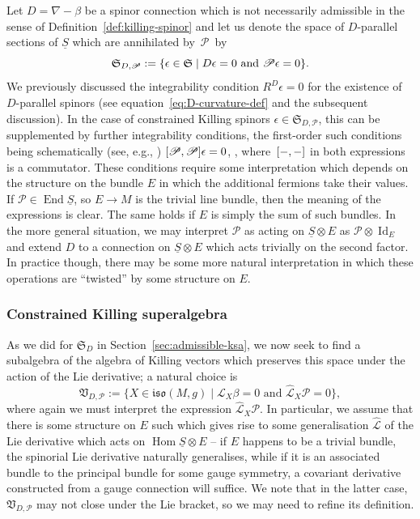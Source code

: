 \documentclass[11pt]{article}
\numberwithin{equation}{section}
\numberwithin{equation}{section}
\newcommand{\fiso}{\mathfrak{iso}}
\newcommand{\fS}{\mathfrak{S}}
\newcommand{\fV}{\mathfrak{V}}
\newcommand{\eL}{\mathscr{L}}
\newcommand{\eP}{\mathscr{P}}
\newcommand{\Sbundle}{\underline{S}}
\newcommand{\eLhat}{\widehat{\eL}}
\newcommand{\1}{\mathbbm{1}}
\DeclareMathOperator{\Id}{Id}
\DeclareMathOperator{\End}{End}
\DeclareMathOperator{\Hom}{Hom}
\begin{document}
Let $D=\nabla-\beta$ be a spinor connection which is not necessarily admissible in the sense of Definition~\ref{def:killing-spinor} and let us denote the space of $D$-parallel sections of $\Sbundle$ which are annihilated by~$\eP$~by
\[
	\fS_{D,\eP} := \qty{\epsilon\in\fS\mid D\epsilon = 0 \text{ and } \eP\epsilon = 0}.
\]
We previously discussed the integrability condition $R^D\epsilon=0$ for the existence of $D$-parallel spinors (see equation~\eqref{eq:D-curvature-def} and the subsequent discussion). In the case of constrained Killing spinors $\epsilon\in\fS_{D,\eP}$, this can be supplemented by further integrability conditions, the first-order such conditions being schematically (see, e.g., \cite{Gran2019})
$\comm{\eP}{\eP}\epsilon = 0$, \smash{$\widehat{D}\eP \epsilon := \comm{D}{\eP}\epsilon = 0$},
where~${\comm{-}{-}}$ in both expressions is a commutator. These conditions require some interpretation which depends on the structure on the bundle $E$ in which the additional fermions take their values. If $\eP\in\End\Sbundle$, so $E\to M$ is the trivial line bundle, then the meaning of the expressions is clear. The same holds if $E$ is simply the sum of such bundles. In the more general situation, we may interpret $\eP$ as acting on $\Sbundle\otimes E$ as $\eP\otimes\Id_E$ and extend $D$ to a connection on $\Sbundle\otimes E$ which acts trivially on the second factor. In practice though, there may be some more natural interpretation in which these operations are ``twisted'' by some structure on $E$.

\subsubsection{Constrained Killing superalgebra}

As we did for $\fS_D$ in Section~\ref{sec:admissible-ksa}, we now seek to find a subalgebra of the algebra of Killing vectors which preserves this space under the action of the Lie derivative; a natural choice is
\[
	\fV_{D,\eP} := \big\{X\in\fiso(M,g) \mid \eL_X \beta = 0 \text{ and } \eLhat_X \eP = 0\big\},
\]
where again we must interpret the expression $\eLhat_X \eP$. In particular, we assume that there is some structure on $E$ such which gives rise to some generalisation $\eLhat$ of the Lie derivative which acts on $\Hom\Sbundle\otimes E$ -- if $E$ happens to be a trivial bundle, the spinorial Lie derivative naturally generalises, while if it is an associated bundle to the principal bundle for some gauge symmetry, a covariant derivative constructed from a gauge connection will suffice. We note that in the latter case, $\fV_{D,\eP}$ may not close under the Lie bracket, so we may need to refine its definition.
\end{document}

